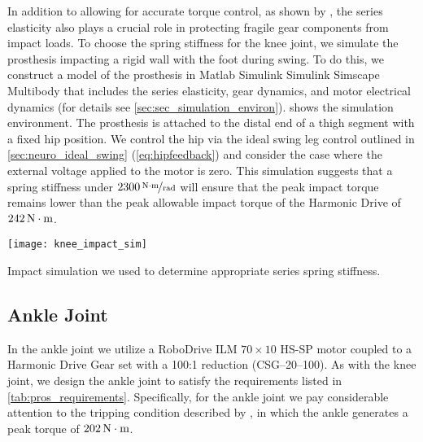 In addition to allowing for accurate torque control, as shown by
\citet{au2007biomechanical,au2008powered}, the series elasticity also plays a
crucial role in protecting fragile gear components from impact loads. To choose
the spring stiffness for the knee joint, we simulate the prosthesis impacting a
rigid wall with the foot during swing. To do this, we construct a model of the
prosthesis in Matlab Simulink Simulink Simscape Multibody that includes the
series elasticity, gear dynamics, and motor electrical dynamics (for
details see \cref{sec:sec_simulation_environ}).  shows
the simulation environment. The prosthesis is attached to the distal end of a
thigh segment with a fixed hip position. We control the hip via the ideal swing
leg control outlined in \cref{sec:neuro_ideal_swing} (\cref{eq:hipfeedback}) and
consider the case where the external voltage applied to the motor is zero. This
simulation suggests that a spring stiffness under $\unitfrac[2300]{N \cdot
m}{rad}$ will ensure that the peak impact torque remains lower than the peak
allowable impact torque of the Harmonic Drive of $\unit[242]{N \cdot m}$.
\begin{marginfigure}[-2.5in]
    \centering 
    \texttt{[image: knee\_impact\_sim]}
    \caption{Impact simulation we used to determine appropriate series spring
    stiffness.}\label{fig:knee_impact sim}
\end{marginfigure}

\subsection{Ankle Joint}
In the ankle joint we utilize a RoboDrive ILM $70\times10$ HS-SP motor coupled
to a Harmonic Drive Gear set with a 100:1 reduction (CSG--20--100). As with the
knee joint, we design the ankle joint to satisfy the requirements listed in
\cref{tab:pros_requirements}. Specifically, for the ankle joint we pay
considerable attention to the tripping condition described by
\citet{pijnappels2005early}, in which the ankle generates a peak torque of
$\unit[202]{N \cdot m}$. 


